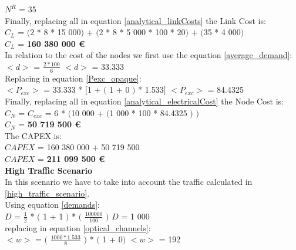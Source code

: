 $N^R$ = 35\\

Finally, replacing all in equation \ref{analytical_linkCosts} the Link Cost is:\\

$C_L$ = $($2 * 8 * 15 000$)$ + $($2 * 8 * 5 000 * 100 * 20$)$ + $($35 * 4 000$)$\\

$C_L$ = \textbf{160 380 000 \euro}\\

In relation to the cost of the nodes we first use the equation \ref{average_demand}:\\

$<d>$ = $\frac{2 * 100}{6}$ \qquad \qquad $<d>$ = 33.333\\

Replacing in equation \ref{Pexc_opaque}:\\

$<P_{exc}>$ = 33.333 * $[$1 + $($ 1 + 0 $)$ * 1.533$]$ \qquad \qquad $<P_{exc}>$ = 84.4325 \\

Finally, replacing all in equation \ref{analytical_electricalCost} the Node Cost is:\\

$C_N$ = $C_{exc}$ = 6 * $($10 000 + $($1 000 * 100 * 84.4325 $)$ $)$\\

$C_N$ = \textbf{50 719 500 \euro}\\

The CAPEX is:\\
$CAPEX$ = 160 380 000 + 50 719 500\\

$CAPEX$ = \textbf{211 099 500 \euro}\\

\textbf{High Traffic Scenario}\\
In this scenario we have to take into account the traffic calculated in \ref{high_traffic_scenario}.\\

Using equation \ref{demands}:\\

$D$ = $\frac{1}{2}$ * $($ 1 + 1 $)$ * $($ $\frac{100 000}{100}$ $)$ \qquad \qquad $D$ = 1 000\\

replacing in equation \ref{optical_channels}:\\

$<w>$ = $($ $\frac{1 000 * 1.533}{8}$ $)$ * $($ 1 + 0$)$ \qquad \quad $<w>$ = 192\\

